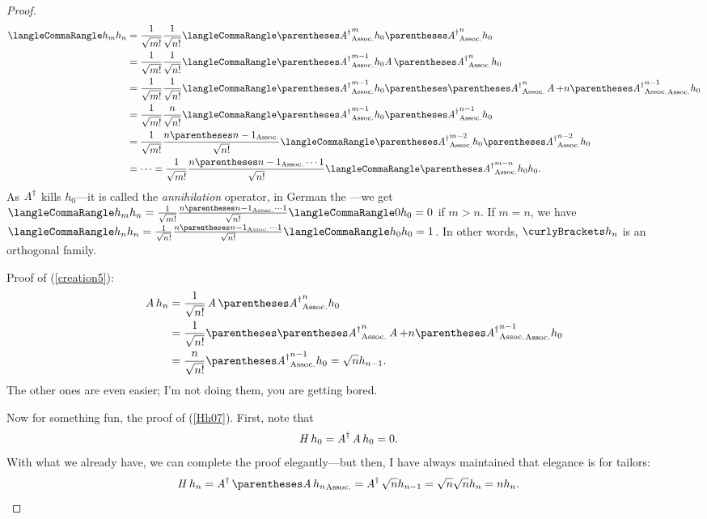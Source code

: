 \documentclass[10pt, a4paper, twoside]{lecturenotes}
\newcommand{\opAdag}{\adj{\opA}}
\begin{document}
\begin{proposition}
\begin{proof}
\begin{align*}
\LTwoInner{h_m}{h_n} &= \frac{1}{\sqrt{\Factorial m}} \frac{1}{\sqrt{\Factorial n}} \LTwoInner{\pa{\opAdag}^{m} h_0}{\pa{\opAdag}^{n} h_0} \\
&= \frac{1}{\sqrt{\Factorial m}} \frac{1}{\sqrt{\Factorial n}}\LTwoInner{\pa{\opAdag}^{m-1} h_0}{\opA\pa{\opAdag}^{n} h_0}\\
&= \frac{1}{\sqrt{\Factorial m}} \frac{1}{\sqrt{\Factorial n}}\LTwoInner{\pa{\opAdag}^{m-1} h_0}{\pa{\pa{\opAdag}^{n}\opA + n\pa{\opAdag}^{n-1}} h_0 }\\
&= \frac{1}{\sqrt{\Factorial m}} \frac{n}{\sqrt{\Factorial n}} 
  \LTwoInner{\pa{\opAdag}^{m-1} h_0}{\pa{\opAdag}^{n-1} h_0}\\
&= \frac{1}{\sqrt{\Factorial m}} 
  \frac{n\pa{n-1}}{\sqrt{\Factorial n}} 
  \LTwoInner{\pa{\opAdag}^{m-2} h_0}{\pa{\opAdag}^{n-2} h_0}\\
  &= \dotsb = \frac{1}{\sqrt{\Factorial m}} 
  \frac{n\pa{n-1}\dotsm 1}{\sqrt{\Factorial n}} 
  \LTwoInner{\pa{\opAdag}^{m-n} h_0}{h_0}\text.
\end{align*}
As $\opAdag$ kills $h_0$---it is called the \emph{annihilation} operator, in German the ---we get $
  \LTwoInner{h_m}{h_n} =
  \frac{1}{\sqrt{\Factorial m}} 
  \frac{n\pa{n-1}\dotsm 1}{\sqrt{\Factorial n}} 
  \LTwoInner{0}{h_0}=0$ if $m>n$. If $m=n$, we have $
  \LTwoInner{h_n}{h_n} =
  \frac{1}{\sqrt{\Factorial n}} 
  \frac{n\pa{n-1}\dotsm 1}{\sqrt{\Factorial n}} 
  \LTwoInner{h_0}{h_0}=1$.  
  In other words, $\set{h_n}$ is an orthogonal family.

  Proof of (\ref{creation5}):
  \begin{align*}
  \opA h_n &= \frac{1}{\sqrt{\Factorial n}} \opA\pa{\opAdag}^n h_0 \\
  &= \frac{1}{\sqrt{\Factorial n}}\pa{\pa{\opAdag}^n\opA + n \pa{\opAdag}^{n-1}}h_0\\
  &= \frac{n}{\sqrt{\Factorial n}} \pa{\opAdag}^{n-1} h_0 = \sqrt{n} h_{n-1}\text.
  \end{align*}
  The other ones are even easier; I'm not doing them, you are getting bored.

  Now for something fun, the proof of (\ref{Hh07}). First, note that
  \begin{align*}
    \opH h_0 &= \opAdag \opA h_0 = 0\text.
  \end{align*}
  With what we already have, we can complete the proof elegantly---but then, I have always maintained that elegance is for tailors:
 \begin{align*}
   \opH h_n &= \opAdag \pa{\opA h_n} = \opAdag \sqrt{n} h_{n-1} = \sqrt{n} \sqrt{n} h_n = n h_n\text.
 \end{align*}
\end{proof}
\end{proposition}
\end{document}
